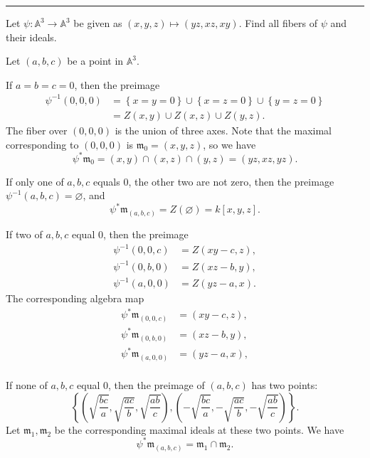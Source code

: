 \documentclass[letterpaper, 12pt]{article}
\begin{document}
\noindent\rule{7in}{2.8pt}
\begin{problem}{2.11}
Let \(\psi:\mathbb{A}^3\rightarrow \mathbb{A}^3\) be given as \((x,y,z)\mapsto (yz,xz,xy)\). Find all fibers of \(\psi\) and their ideals. 
\end{problem}
\begin{solution}
Let \((a,b,c)\) be a point in \(\mathbb{A}^3\). 

If \(a=b=c=0\), then the preimage 
\begin{align*}
     \psi^{-1}(0,0,0)&=\left\{ x=y=0 \right\}\cup \left\{ x=z=0 \right\}\cup \left\{ y=z=0 \right\}\\ 
                     &=Z(x,y)\cup Z(x,z)\cup Z(y,z).
\end{align*}
The fiber over \((0,0,0)\) is the union of three axes. Note that the maximal corresponding to \((0,0,0)\) is \(\mathfrak{m}_0=(x,y,z)\), so we have 
\[\psi^*\mathfrak{m}_0=(x,y)\cap (x,z)\cap (y,z)=(yz,xz,yz).\]

If only one of \(a,b,c\) equals \(0\), the other two are not zero, then the preimage \(\psi^{-1}(a,b,c)=\varnothing\), and 
\[\psi^*\mathfrak{m}_{(a,b,c)}=Z(\varnothing)=k[x,y,z].\]

If two of \(a,b,c\) equal \(0\), then the preimage 
\begin{align*}
     \psi^{-1}(0,0,c)&=Z(xy-c,z),\\ 
     \psi^{-1}(0,b,0)&=Z(xz-b,y),\\ 
     \psi^{-1}(a,0,0)&=Z(yz-a,x).
\end{align*}
The corresponding algebra map 
\begin{align*}
     \psi^*\mathfrak{m}_{(0,0,c)}&=(xy-c,z),\\
     \psi^*\mathfrak{m}_{(0,b,0)}&=(xz-b,y),\\
     \psi^*\mathfrak{m}_{(a,0,0)}&=(yz-a,x),\\
\end{align*}

If none of \(a,b,c\) equal \(0\), then the preimage of \((a,b,c)\) has two points:
\[\left\{ (\sqrt{\frac{bc}{a}},\sqrt{\frac{ac}{b}},\sqrt{\frac{ab}{c}}),(-\sqrt{\frac{bc}{a}},-\sqrt{\frac{ac}{b}},-\sqrt{\frac{ab}{c}}) \right\}.\]
Let \(\mathfrak{m}_1,\mathfrak{m}_2\) be the corresponding maximal ideals at these two points. We have 
\[\psi^*\mathfrak{m}_{(a,b,c)}=\mathfrak{m}_1\cap \mathfrak{m}_2.\] 

\end{solution}
\end{document}
